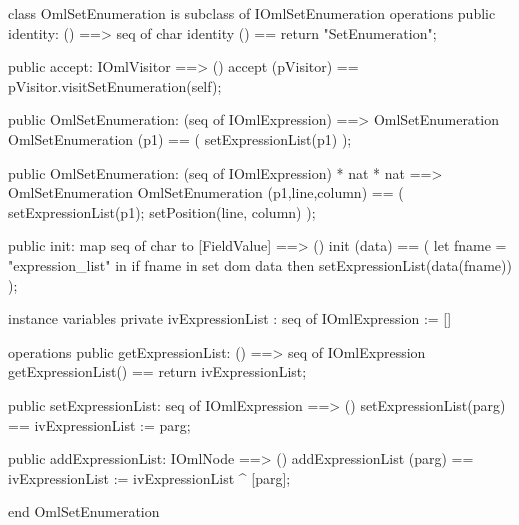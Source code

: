 \begin{vdm_al}
class OmlSetEnumeration is subclass of IOmlSetEnumeration
operations
  public identity: () ==> seq of char
  identity () == return "SetEnumeration";

  public accept: IOmlVisitor ==> ()
  accept (pVisitor) == pVisitor.visitSetEnumeration(self);

  public OmlSetEnumeration:
    (seq of IOmlExpression) ==> OmlSetEnumeration
  OmlSetEnumeration (p1) == 
    ( setExpressionList(p1) );

  public OmlSetEnumeration:
    (seq of IOmlExpression) *
    nat *
    nat ==> OmlSetEnumeration
  OmlSetEnumeration (p1,line,column) == 
    ( setExpressionList(p1);
      setPosition(line, column) );

  public init: map seq of char to [FieldValue] ==> ()
  init (data) ==
    ( let fname = "expression_list" in
        if fname in set dom data
        then setExpressionList(data(fname)) );

instance variables
  private ivExpressionList : seq of IOmlExpression := []

operations
  public getExpressionList: () ==> seq of IOmlExpression
  getExpressionList() == return ivExpressionList;

  public setExpressionList: seq of IOmlExpression ==> ()
  setExpressionList(parg) == ivExpressionList := parg;

  public addExpressionList: IOmlNode ==> ()
  addExpressionList (parg) == ivExpressionList := ivExpressionList ^ [parg];

end OmlSetEnumeration
\end{vdm_al}

